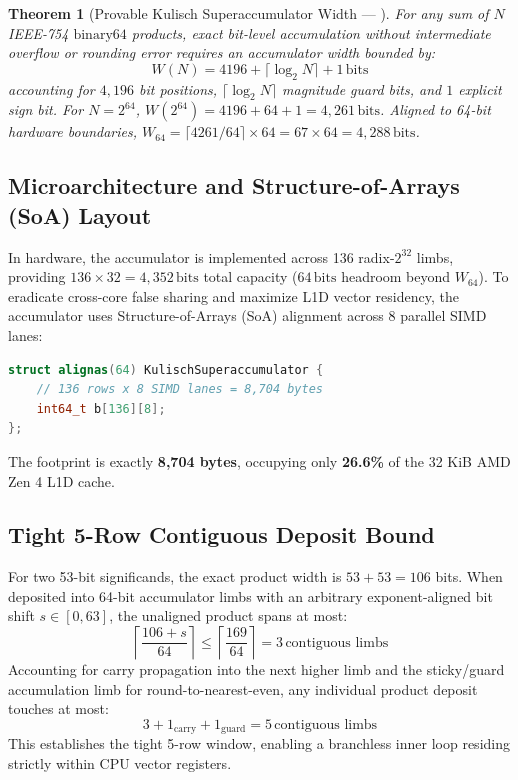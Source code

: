 \documentclass[journal,10pt,compsoc]{IEEEtran}
\theoremstyle{plain}
\newtheorem{theorem}{Theorem}
\theoremstyle{definition}
\begin{document}
\begin{theorem}[Provable Kulisch Superaccumulator Width --- \label{thm:polydim_kulisch_width}]
For any sum of $N$ IEEE-754 $\mathrm{binary64}$ products, exact bit-level accumulation without intermediate overflow or rounding error requires an accumulator width bounded by:
\begin{equation}
\label{eq:kulisch_bound}
W(N) = 4196 + \lceil \log_2 N \rceil + 1\,\text{bits}
\end{equation}
accounting for $4{,}196$ bit positions, $\lceil \log_2 N \rceil$ magnitude guard bits, and $1$ explicit sign bit. For $N = 2^{64}$, $W(2^{64}) = 4196 + 64 + 1 = 4{,}261\,\text{bits}$. Aligned to 64-bit hardware boundaries, $W_{64} = \lceil 4261 / 64 \rceil \times 64 = 67 \times 64 = 4{,}288\,\text{bits}$.
\end{theorem}

\subsection{Microarchitecture and Structure-of-Arrays (SoA) Layout}
In hardware, the accumulator is implemented across 136 radix-$2^{32}$ limbs, providing $136 \times 32 = 4{,}352\,\text{bits}$ total capacity ($64\,\text{bits}$ headroom beyond $W_{64}$). To eradicate cross-core false sharing and maximize L1D vector residency, the accumulator uses Structure-of-Arrays (SoA) alignment across 8 parallel SIMD lanes:
\begin{lstlisting}[language=C++,caption={Kulisch SoA Layout in C++20}]
struct alignas(64) KulischSuperaccumulator {
    // 136 rows x 8 SIMD lanes = 8,704 bytes
    int64_t b[136][8];
};
\end{lstlisting}
The footprint is exactly \textbf{8,704 bytes}, occupying only \textbf{26.6\%} of the 32 KiB AMD Zen 4 L1D cache.

\subsection{Tight 5-Row Contiguous Deposit Bound}
For two 53-bit significands, the exact product width is $53 + 53 = 106$ bits. When deposited into 64-bit accumulator limbs with an arbitrary exponent-aligned bit shift $s \in [0, 63]$, the unaligned product spans at most:
\begin{equation}
\label{eq:deposit_span}
\left\lceil \frac{106 + s}{64} \right\rceil \le \left\lceil \frac{169}{64} \right\rceil = 3\,\text{contiguous limbs}
\end{equation}
Accounting for carry propagation into the next higher limb and the sticky/guard accumulation limb for round-to-nearest-even, any individual product deposit touches at most:
\begin{equation}
\label{eq:5row}
3 + 1_{\text{carry}} + 1_{\text{guard}} = 5\,\text{contiguous limbs}
\end{equation}
This establishes the tight 5-row window, enabling a branchless inner loop residing strictly within CPU vector registers.
\end{document}
